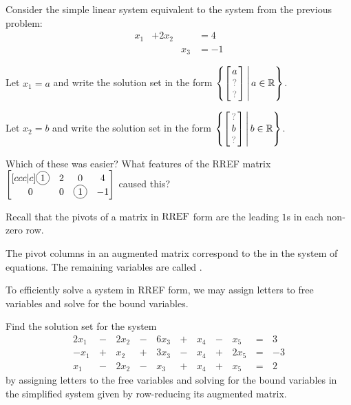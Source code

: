 \begin{applicationActivities}
\begin{activity}{10}
Consider the simple linear system equivalent to the system
from the previous problem:
	\begin{alignat*}{3}
		x_1 &+ 2x_2 & &= 4\\
	     	 & &x_3 &= -1
	\end{alignat*}
\begin{subactivity}
Let \(x_1=a\) and write the solution set in the form
\(
  \left\{
    \begin{bmatrix} a \\ \unknown \\ \unknown \end{bmatrix}
  \,\middle|\,
    a \in \IR
  \right\}
\).
\end{subactivity}
\begin{subactivity}
Let \(x_2=b\) and write the solution set in the form
\(
  \left\{
    \begin{bmatrix} \unknown \\ b \\ \unknown \end{bmatrix}
  \,\middle|\,
    b \in \IR
  \right\}
\).
\end{subactivity}
\begin{subactivity}
Which of these was easier?  What features of the RREF matrix
\(
  \begin{bmatrix}[ccc|c]
    \circledNumber{1} & 2 & 0 & 4 \\
    0 & 0 & \circledNumber{1} & -1
  \end{bmatrix}
\) caused this?
\end{subactivity}
\end{activity}

\begin{definition}
Recall that the pivots of a matrix in \(\operatorname{RREF}\) form are the leading
\(1\)s in each non-zero row.

\vspace{0.2in}

The pivot columns in an augmented matrix correspond to the
 in the system of equations.
The remaining variables are called .

\vspace{0.2in}

To efficiently solve a system in RREF form, we may assign letters to free
variables and solve for the bound variables.
\end{definition}

\begin{activity}{10}
Find the solution set for the system
\begin{alignat*}{6}
2x_1&\,-\,&2x_2&\,-\,&6x_3&\,+\,&x_4&\,-\,&x_5&\,=\,&3 \\
-x_1&\,+\,&x_2&\,+\,&3x_3&\,-\,&x_4&\,+\,&2x_5 &\,=\,& -3 \\
x_1&\,-\,&2x_2&\,-\,&x_3&\,+\,&x_4&\,+\,&x_5 &\,=\,& 2
\end{alignat*}
by assigning letters to the free variables and solving for the bound variables
in the simplified system given by row-reducing its augmented matrix.
\end{activity}


\end{applicationActivities}
